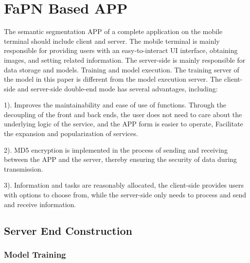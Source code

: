 
\section{FaPN Based APP}
The semantic segmentation APP of a complete application on the mobile terminal should include client and server. 
The mobile terminal is mainly responsible for providing users with an easy-to-interact UI interface, obtaining images, and setting related information. 
The server-side is mainly responsible for data storage and models. Training and model execution. The training server of the model in this paper is different from the model execution server. The client-side and server-side double-end mode has several advantages, including: 

1). Improves the maintainability and ease of use of functions. Through the decoupling of the front and back ends, the user does not need to care about the underlying logic of the service, and the APP form is easier to operate, Facilitate the expansion and popularization of services. 

2). MD5 encryption is implemented in the process of sending and receiving between the APP and the server, thereby ensuring the security of data during transmission. 

3). Information and tasks are reasonably allocated, the client-side provides users with options to choose from, while the server-side only needs to process and send and receive information.

\subsection{Server End Construction}

\subsubsection{Model Training}

